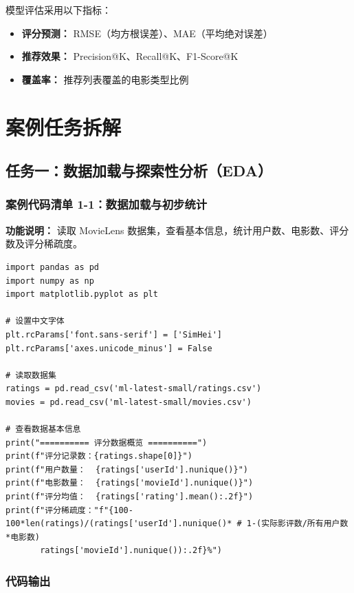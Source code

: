 \documentclass[12pt,a4paper]{ctexart}
\begin{document}
模型评估采用以下指标：
\begin{itemize}[leftmargin=*]
    \item \textbf{评分预测：} RMSE（均方根误差）、MAE（平均绝对误差）
    \item \textbf{推荐效果：} Precision@K、Recall@K、F1-Score@K
    \item \textbf{覆盖率：} 推荐列表覆盖的电影类型比例
\end{itemize}

\section{案例任务拆解}

\subsection{任务一：数据加载与探索性分析（EDA）}

\subsubsection{案例代码清单 1-1：数据加载与初步统计}

\textbf{功能说明：} 读取 MovieLens 数据集，查看基本信息，统计用户数、电影数、评分数及评分稀疏度。

\begin{lstlisting}[caption={数据加载与初步统计}, label={lst:1-1}]
import pandas as pd
import numpy as np
import matplotlib.pyplot as plt

# 设置中文字体
plt.rcParams['font.sans-serif'] = ['SimHei']
plt.rcParams['axes.unicode_minus'] = False

# 读取数据集
ratings = pd.read_csv('ml-latest-small/ratings.csv')
movies = pd.read_csv('ml-latest-small/movies.csv')

# 查看数据基本信息
print("========== 评分数据概览 ==========")
print(f"评分记录数：{ratings.shape[0]}")
print(f"用户数量：  {ratings['userId'].nunique()}")
print(f"电影数量：  {ratings['movieId'].nunique()}")
print(f"评分均值：  {ratings['rating'].mean():.2f}")
print(f"评分稀疏度："f"{100-100*len(ratings)/(ratings['userId'].nunique()* # 1-(实际影评数/所有用户数*电影数)
       ratings['movieId'].nunique()):.2f}%")
\end{lstlisting}

\subsubsection{代码输出}
\end{document}
